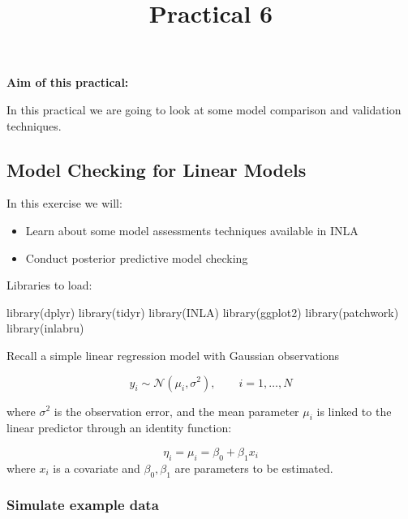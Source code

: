 \documentclass[
  letterpaper,
  DIV=11,
  numbers=noendperiod]{scrartcl}
\title{Practical 6}
\author{}
\date{}
\makeatletter
\newenvironment{Shaded}{\begin{snugshade}}{\end{snugshade}}
\newcommand{\FunctionTok}[1]{\textcolor[rgb]{0.28,0.35,0.67}{#1}}
\newcommand{\NormalTok}[1]{\textcolor[rgb]{0.00,0.23,0.31}{#1}}
\providecommand{\tightlist}{%
  \setlength{\itemsep}{0pt}\setlength{\parskip}{0pt}}\usepackage{longtable,booktabs,array}
\renewcommand{\maketitle}{\bgroup\setlength{\parindent}{0pt}
\begin{flushleft}
  {\sffamily\huge\textbf{\MakeUppercase{\@title}}} \vspace{0.3cm} \newline
  {\Large {\@subtitle}} \newline
  \@author
\end{flushleft}\egroup
}
\makeatother
\begin{document}
\maketitle

\pagestyle{mystyle}


\textbf{Aim of this practical:}

In this practical we are going to look at some model comparison and
validation techniques.

\subsection{Model Checking for Linear
Models}\label{model-checking-for-linear-models}

In this exercise we will:

\begin{itemize}
\tightlist
\item
  Learn about some model assessments techniques available in INLA
\item
  Conduct posterior predictive model checking
\end{itemize}

Libraries to load:

\begin{Shaded}
\begin{Highlighting}[]
\FunctionTok{library}\NormalTok{(dplyr)}
\FunctionTok{library}\NormalTok{(tidyr)}
\FunctionTok{library}\NormalTok{(INLA)}
\FunctionTok{library}\NormalTok{(ggplot2)}
\FunctionTok{library}\NormalTok{(patchwork)}
\FunctionTok{library}\NormalTok{(inlabru)     }
\end{Highlighting}
\end{Shaded}

Recall a simple linear regression model with Gaussian observations

\[
y_i\sim\mathcal{N}(\mu_i, \sigma^2), \qquad i = 1,\dots,N
\]

where \(\sigma^2\) is the observation error, and the mean parameter
\(\mu_i\) is linked to the linear predictor through an identity
function:

\[
\eta_i = \mu_i = \beta_0 + \beta_1 x_i
\] where \(x_i\) is a covariate and \(\beta_0, \beta_1\) are parameters
to be estimated.

\subsubsection{Simulate example data}\label{simulate-example-data}
\end{document}
